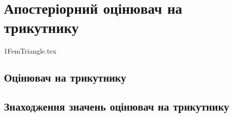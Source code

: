 
\section{Апостеріорний оцінювач на трикутнику}

{1FemTriangle.tex}

\subsection{Оцінювач на трикутнику}
\subsection{Знаходження значень оцінювач на трикутнику}
